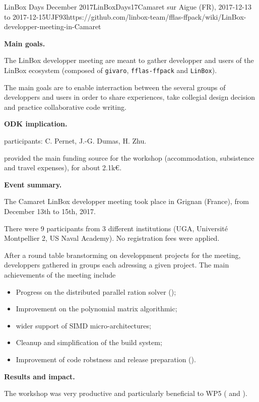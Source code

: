 \begin{event}{LinBox Days December 2017}{LinBoxDays17}{Camaret sur Aigue (FR),
2017-12-13 to 2017-12-15}{UJF}{9}{3}{https://github.com/linbox-team/fflas-ffpack/wiki/LinBox-developper-meeting-in-Camaret}

\textbf{Main goals.}

The LinBox developper meeting are meant to gather developper and users of the
LinBox ecosystem (composed of \texttt{givaro}, \texttt{fflas-ffpack} and
\texttt{LinBox}).

The main goals are to enable interraction between the several groups of
developpers and users in order to share experiences, take collegial design
decision and practice collaborative code writing.

\textbf{ODK implication.} 

\ODK participants: C. Pernet, J.-G. Dumas, H. Zhu.

\ODK provided the main funding source for the workshop (accommodation,
subsistence and travel expenses), for about 2.1k\euro.

\textbf{Event summary.} 

The Camaret LinBox developper meeting took place in Grignan (France), from December
13th to 15th, 2017.

There were 9 participants from 3 different institutions (UGA, Université
Montpellier 2, US Naval Academy).
No registration fees were applied.

After a round table branstorming on developpment projects for the meeting,
developpers gathered in groups each adressing a given project.
The main achievements of the meeting include
\begin{itemize}
\item Progress on the distributed parallel ration solver ();
\item Improvement on the polynomial matrix algorithmic;
\item wider support of SIMD micro-architectures;
\item Cleanup and simplification of the build system;
\item Improvement of code robstness and release preparation ().
\end{itemize}


\textbf{Results and impact.} 

The workshop was very productive and particularly beneficial to WP5
( and ).
\end{event}
